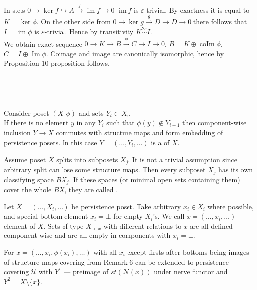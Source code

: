 \begin{pf}
  In s.e.s $0 \to \ker{f} \hookrightarrow A \xrightarrow{f} \operatorname{im}f \to 0$ $\operatorname{im}f$ is $\varepsilon$-trivial. By exactness it is equal to $K = \ker \phi$. On the other side from $0 \to \ker{g} \xrightarrow{g} D \to D \to 0$ there follows that $I = \operatorname{im} \phi$ is $\varepsilon$-trivial. Hence by transitivity $K \stackrel{2\varepsilon}{\sim} I$.\\

  We obtain exact sequence $0 \to K \to B \xrightarrow{\phi} C \to I \to 0$. $B = K \oplus \operatorname{coIm}\phi$, $C = I \oplus \operatorname{Im} \phi$. Coimage and image are canonically isomorphic, hence by Proposition 10 proposition follows.
\end{pf}\\

\begin{definition} ~ \par
  Consider poset $(X,\phi)$ and sets $Y_i \subset X_i$.\\

  If there is no element $y$ in any $Y_i$ such that $\phi(y) \not\in Y_{i+1}$ then component-wise inclusion $Y \to X$ commutes with structure maps and form embedding of persistence posets. In this case $Y=(\ldots,Y_i,\ldots)$ is a  of $X$.
\end{definition}

\begin{definition}
  Assume poset $X$ splits into subposets $X_j$. It is not a trivial assumption since arbitrary split can lose some structure maps. Then every subposet $X_j$ has its own classifying space $BX_j$. If these spaces (or minimal open sets containing them) cover the whole $BX$, they are called .
\end{definition}

Let $X=(\ldots,X_i,\ldots)$ be persistence poset. Take arbitrary $x_i \in X_i$ where possible, and special bottom element $x_i = \bot$ for empty $X_i$'s. We call $x = (\ldots, x_i, \ldots)$ element of $X$. Sets of type $X_{<x}$ with different relations to $x$ are all defined component-wise and are all empty in components with $x_i = \bot$.\\

\begin{proposition}
  For $x = (\ldots,x_i,\phi(x_i),\ldots)$ with all $x_i$ except firsts after bottoms being images of structure maps covering from Remark 6 can be extended to persistence covering $\mathcal{U}$ with $Y^1$ --- preimage of $st(\mathcal{N}(x))$ under nerve functor and $Y^2 = X \setminus \{x\}$.
\end{proposition}

